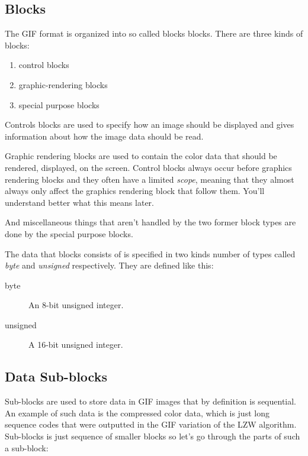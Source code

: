  \subsection{Blocks}

  The GIF format is organized into so called blocks blocks. There are three kinds of
  blocks:

  \begin{enumerate}
  \item control blocks
  \item graphic-rendering blocks
  \item special purpose blocks
  \end{enumerate}

  Controls blocks are used to specify how an image should be displayed
  and gives information about how the image data should be read.

  Graphic rendering blocks are used to contain the color data that
  should be rendered, displayed, on the screen. Control blocks always
  occur before graphics rendering blocks and they often have a limited
  \textit{scope}, meaning that they almost always only affect the
  graphics rendering block that follow them. You'll understand better
  what this means later.

  And miscellaneous things that aren't handled by the two former
  block types are done by the special purpose blocks.

  The data that blocks consists of is specified in two kinds number of
  types called \textit{byte} and \textit{unsigned} respectively. They
  are defined like this:

  \begin{description}
  \item[byte] An 8-bit unsigned integer.
  \item[unsigned] A 16-bit unsigned integer.
  \end{description}

  \subsection{Data Sub-blocks}
  \label{sec:gif-data-sub-blocks}

  Sub-blocks are used to store data in GIF images that by definition
  is sequential. An example of such data is the compressed color data,
  which is just long sequence codes that were outputted in the GIF
  variation of the LZW algorithm. Sub-blocks is just sequence of
  smaller blocks so let's go through the parts of such a sub-block:

